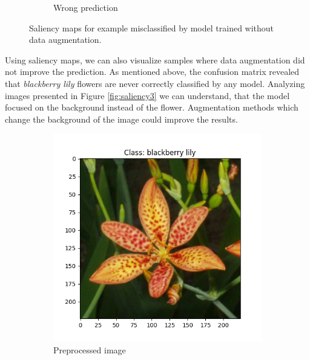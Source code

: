 \begin{figure}[h!]
\begin{subfigure}[b]{0.24\textwidth}
        \caption{Wrong prediction}
    \end{subfigure}
    \caption{Saliency maps for example misclassified by model trained without data augmentation.}
    \label{fig:saliency2}
\end{figure}

Using saliency maps, we can also visualize samples where data augmentation did not improve the prediction. As mentioned above, the confusion matrix revealed that \textit{blackberry lily} flowers are never correctly classified by any model. Analyzing images presented in Figure \ref{fig:saliency3} we can understand, that the model focused on the background instead of the flower. Augmentation methods which change the background of the image could improve the results.

\begin{figure}[h!]
    \centering
    \begin{subfigure}[b]{0.32\textwidth}
        \centering
        \includegraphics[width=\textwidth]{Images/saliency-flowers/249/image_249.png}
        \caption{Preprocessed image}
    \end{subfigure}
    \hfill
    \begin{subfigure}[b]{0.32\textwidth}
        \centering

\end{subfigure}
\end{figure}
